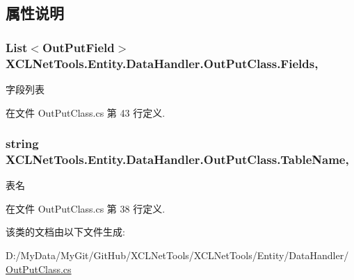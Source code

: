 \subsection{属性说明}
\hypertarget{class_x_c_l_net_tools_1_1_entity_1_1_data_handler_1_1_out_put_class_a7621d8ecd1d8f1f7bb04736dc658509a}{
\subsubsection[{Fields}]{\setlength{\rightskip}{0pt plus 5cm}List$<${\bf Out\-Put\-Field}$>$ X\-C\-L\-Net\-Tools.\-Entity.\-Data\-Handler.\-Out\-Put\-Class.\-Fields\hspace{0.3cm}{\ttfamily [get]}, {\ttfamily [set]}}}\label{class_x_c_l_net_tools_1_1_entity_1_1_data_handler_1_1_out_put_class_a7621d8ecd1d8f1f7bb04736dc658509a}


字段列表 



在文件 Out\-Put\-Class.\-cs 第 43 行定义.

\hypertarget{class_x_c_l_net_tools_1_1_entity_1_1_data_handler_1_1_out_put_class_ab4c63943c19492123db3d04eeaa4dbe1}{
\subsubsection[{Table\-Name}]{\setlength{\rightskip}{0pt plus 5cm}string X\-C\-L\-Net\-Tools.\-Entity.\-Data\-Handler.\-Out\-Put\-Class.\-Table\-Name\hspace{0.3cm}{\ttfamily [get]}, {\ttfamily [set]}}}\label{class_x_c_l_net_tools_1_1_entity_1_1_data_handler_1_1_out_put_class_ab4c63943c19492123db3d04eeaa4dbe1}


表名 



在文件 Out\-Put\-Class.\-cs 第 38 行定义.



该类的文档由以下文件生成\-:\begin{DoxyCompactItemize}
\item 
D\-:/\-My\-Data/\-My\-Git/\-Git\-Hub/\-X\-C\-L\-Net\-Tools/\-X\-C\-L\-Net\-Tools/\-Entity/\-Data\-Handler/\hyperlink{_out_put_class_8cs}{Out\-Put\-Class.\-cs}\end{DoxyCompactItemize}
